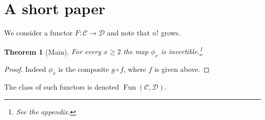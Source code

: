 \documentclass{article}
\newtheorem{theorem}{Theorem}
\newcommand{\cat}[1]{\mathcal{#1}}
\begin{document}
\section{A short paper}
We consider a functor $F\colon \cat{C}\to \cat{D}$ and note that $n!$ grows.
\begin{theorem}[Main]
For every $x\ge 2$ the map $\phi_x$ is invertible.\footnote{See the appendix.}
\end{theorem}
\begin{proof}
Indeed $\phi_x$ is the composite $g\circ f$, where $f$ is given above.
\end{proof}
The class of such functors is denoted $\operatorname{Fun}(\cat{C},\cat{D})$.
\end{document}
